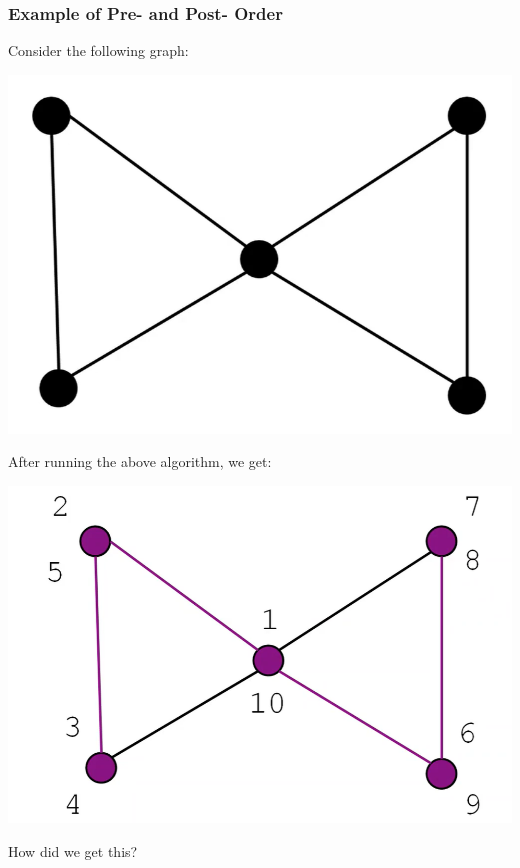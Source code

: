 \documentclass[letterpaper]{article}
\begin{document}
\subsubsection{Example of Pre- and Post- Order}
Consider the following graph:
\begin{center}
    \includegraphics[scale=0.3]{assets/graph_tri.png}
\end{center}
After running the above algorithm, we get:
\begin{center}
    \includegraphics[scale=0.3]{assets/graph_tri_2.png}
\end{center}
How did we get this? 
\end{document}
